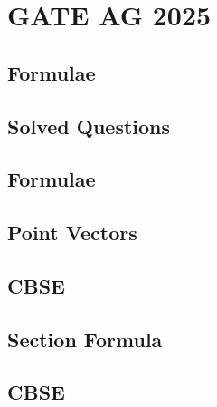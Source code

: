 \documentclass[journal]{IEEEtran}
\begin{document}
\newpage


\tableofcontents

\newpage
\onecolumn


\renewcommand{\thetable}{\theenumi}
\renewcommand{\thesubsection}{\thesection.\arabic{subsection}}


%
\section{GATE AG 2025}
\subsection{Formulae}

\subsection{Solved Questions}

\iffalse
\subsection{Formulae}

\subsection{Point Vectors}

\subsection{CBSE}

%
\subsection{Section Formula}

\subsection{CBSE}

\end{document}
